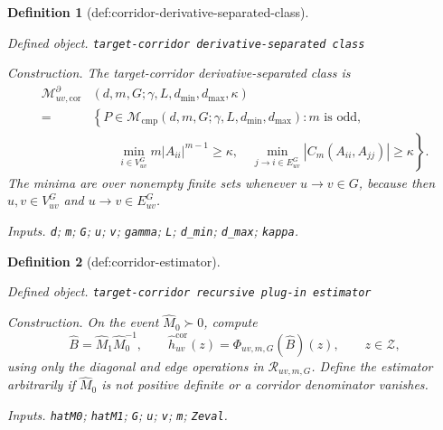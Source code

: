 \documentclass{article}
\newtheorem{definition}{Definition}
\begin{document}
\begin{definition}[def:corridor-derivative-separated-class]\label{def:corridor-derivative-separated-class}
\par\smallskip\noindent\emph{Defined object.} \texttt{target-\allowbreak{}corridor derivative-\allowbreak{}separated class}
\par\smallskip\noindent\emph{Construction.} The target-corridor derivative-separated class is
\[
\begin{split}
 \mathcal M_{uv,\mathrm{cor}}^{\partial}
 &(d,m,G;\gamma,L,d_{\min},d_{\max},\kappa)\\
 ={}&\left\{P\in\mathcal M_{\mathrm{cmp}}(d,m,G;\gamma,L,d_{\min},d_{\max}):
 m\text{ is odd},\right.\\
 &\left.\qquad
 \min_{i\in V_{uv}^{G}}m|A_{ii}|^{m-1}\ge\kappa,
 \quad
 \min_{j\to i\in E_{uv}^{G}}|C_m(A_{ii},A_{jj})|\ge\kappa
 \right\}.
\end{split}
\]
The minima are over nonempty finite sets whenever \(u\to v\in G\), because then \(u,v\in V_{uv}^{G}\) and \(u\to v\in E_{uv}^{G}\).
\par\smallskip\noindent\emph{Inputs.} \texttt{d}; \texttt{m}; \texttt{G}; \texttt{u}; \texttt{v}; \texttt{gamma}; \texttt{L}; \texttt{d\_\allowbreak{}min}; \texttt{d\_\allowbreak{}max}; \texttt{kappa}.
\end{definition}

\begin{definition}[def:corridor-estimator]\label{def:corridor-estimator}
\par\smallskip\noindent\emph{Defined object.} \texttt{target-\allowbreak{}corridor recursive plug-\allowbreak{}in estimator}
\par\smallskip\noindent\emph{Construction.} On the event \(\widehat M_0\succ0\), compute
\[
 \widehat B=\widehat M_1\widehat M_0^{-1},
 \qquad
 \widehat h_{uv}^{\mathrm{cor}}(z)
 =\Phi_{uv,m,G}(\widehat B)(z),\qquad z\in\mathcal Z,
\]
using only the diagonal and edge operations in \(\mathscr R_{uv,m,G}\).  Define the estimator arbitrarily if \(\widehat M_0\) is not positive definite or a corridor denominator vanishes.
\par\smallskip\noindent\emph{Inputs.} \texttt{hatM0}; \texttt{hatM1}; \texttt{G}; \texttt{u}; \texttt{v}; \texttt{m}; \texttt{Zeval}.
\end{definition}
\end{document}
